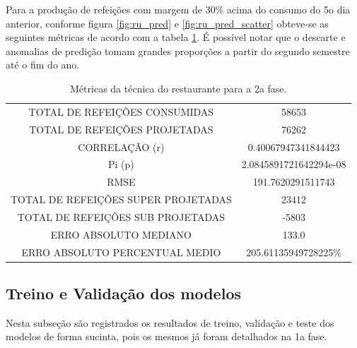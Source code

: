                 Para a produção de refeições com margem de 30\% acima do consumo do 5o dia anterior, conforme figura \ref{fig:ru_pred} e \ref{fig:ru_pred_scatter} obteve-se as seguintes métricas de acordo com a tabela \ref{table:case2_rupred}. É possível notar que o descarte e anomalias de predição tomam grandes proporções a partir do segundo semestre até o fim do ano.
                \begin{table}[!ht]
                \centering
                \caption{Métricas da técnica do restaurante para a 2a fase.}
                \label{table:case2_rupred}
                    \begin{tabular}{|c|c|}
                    \rowcolor{gray!50}
                    \hline
                    \multicolumn{2}{c}{Consumo com margem 30\% acima do 5o dia anterior}\\ \hline     
                    TOTAL DE REFEIÇÕES CONSUMIDAS & 58653  \\
                TOTAL DE REFEIÇÕES PROJETADAS & 76262 \\ 
                CORRELAÇÃO (r)&  0.40067947341844423 \\
                Pi (p) & 2.0845891721642294e-08\\
                RMSE & 191.7620291511743 \\
                TOTAL DE REFEIÇÕES SUPER PROJETADAS & 23412 \\
                TOTAL DE REFEIÇÕES SUB PROJETADAS & -5803 \\
                ERRO ABSOLUTO MEDIANO & 133.0 \\
                ERRO ABSOLUTO PERCENTUAL MEDIO & 205.61135949728225\% \\  \hline \end{tabular}\end{table}
                
    	\subsection{Treino e Validação dos modelos}
    	    Nesta subseção são registrados os resultados de treino, validação e teste dos modelos de forma sucinta, pois os mesmos já foram detalhados na 1a fase.\\
    	 
